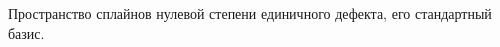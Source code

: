 \documentclass[__main__.tex]{subfiles}
\begin{document}
Пространство сплайнов нулевой степени единичного дефекта, его стандартный базис.
\end{document}
